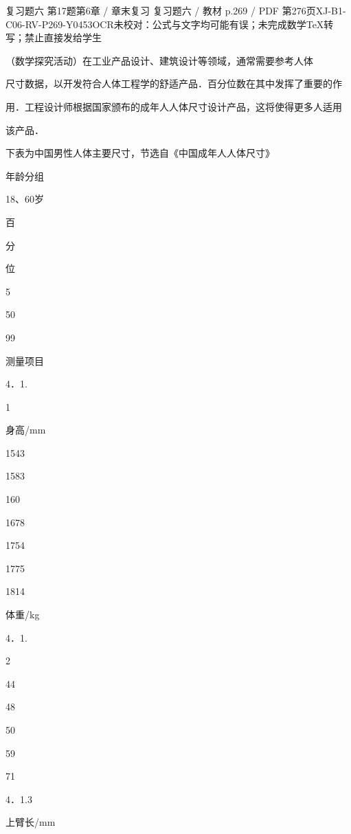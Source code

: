 \begin{bankitem}{复习题六 第17题}{第6章 / 章末复习 复习题六 / 教材 p.269 / PDF 第276页}{XJ-B1-C06-RV-P269-Y0453}{OCR未校对：公式与文字均可能有误；未完成数学TeX转写；禁止直接发给学生}
\begin{ocrdraft}
\par
（数学探究活动）在工业产品设计、建筑设计等领域，通常需要参考人体
\par
尺寸数据，以开发符合人体工程学的舒适产品．百分位数在其中发挥了重要的作
\par
用．工程设计师根据国家颁布的成年人人体尺寸设计产品，这将使得更多人适用
\par
该产品．
\par
下表为中国男性人体主要尺寸，节选自《中国成年人人体尺寸》
\par
年龄分组
\par
18、60岁
\par
百
\par
分
\par
位
\par
5
\par
50
\par
99
\par
测量项目
\par
4．1.
\par
1
\par
身高/mm
\par
1543
\par
1583
\par
160
\par
1678
\par
1754
\par
1775
\par
1814
\par
体重/kg
\par
4．1.
\par
2
\par
44
\par
48
\par
50
\par
59
\par
71
\par
4．1.3
\par
上臂长/mm
\par

\end{ocrdraft}
\end{bankitem}
